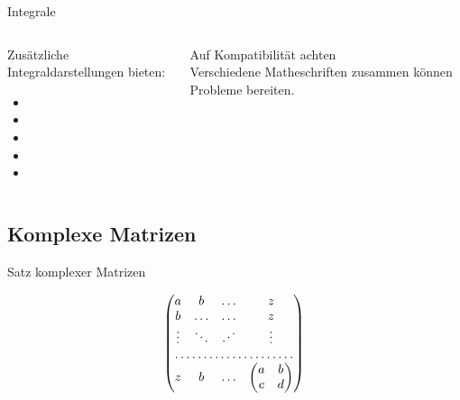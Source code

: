 \documentclass[
	vorläufig=false,
	datum=2016-11-18,
	titel={Mathematiksatz II},
	web=false,
]{../tex/latexkurs-slides}
\begin{document}
\begin{frame}[fragile]{Integrale}
\begin{columns}
\begin{column}{.4\textwidth}
Zusätzliche Integraldarstellungen bieten:
\begin{itemize}
\item {}
\item {}
\item {}
\item {}
\item {}
\end{itemize}
\end{column}
\begin{column}{.5\textwidth}
\alert{Auf Kompatibilität achten}\\
Verschiedene Matheschriften zusammen können Probleme bereiten.
\end{column}
\end{columns}
\end{frame}


\subsection{Komplexe Matrizen}
\begin{frame}[fragile]{Satz komplexer Matrizen}
\begin{LTXexample}[width=.4\textwidth]
\[\begin{pmatrix}
a & b     & \dots & z\\
b & \dots & \dots & z\\
\vdots & \ddots& \reflectbox{$\ddots$} & \vdots\\
\hdotsfor{4}\\
z & b & \dots &
\begin{pmatrix}a & b \\ c & d
\end{pmatrix}
\end{pmatrix}\]

\end{LTXexample}
\end{frame}
\end{document}
